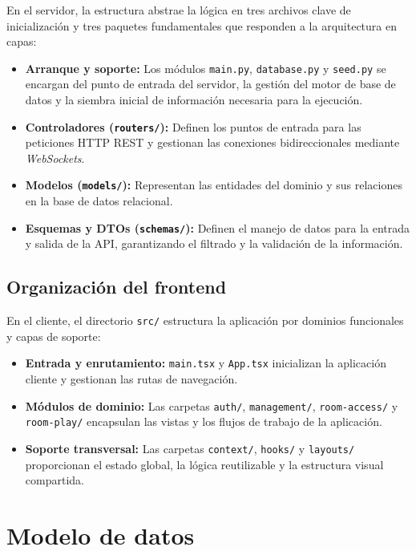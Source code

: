 En el servidor, la estructura abstrae la lógica en tres archivos clave de inicialización y tres paquetes fundamentales que responden a la arquitectura en capas:

\begin{itemize}
    \item \textbf{Arranque y soporte:} Los módulos \texttt{main.py}, \texttt{database.py} y \texttt{seed.py} se encargan del punto de entrada del servidor, la gestión del motor de base de datos y la siembra inicial de información necesaria para la ejecución.
    \item \textbf{Controladores (\texttt{routers/}):} Definen los puntos de entrada para las peticiones HTTP REST y gestionan las conexiones bidireccionales mediante \textit{WebSockets}.
    \item \textbf{Modelos (\texttt{models/}):} Representan las entidades del dominio y sus relaciones en la base de datos relacional.
    \item \textbf{Esquemas y DTOs (\texttt{schemas/}):} Definen el manejo de datos para la entrada y salida de la API, garantizando el filtrado y la validación de la información.
\end{itemize}

\subsection{Organización del frontend}

En el cliente, el directorio \texttt{src/} estructura la aplicación por dominios funcionales y capas de soporte:

\begin{itemize}
    \item \textbf{Entrada y enrutamiento:} \texttt{main.tsx} y \texttt{App.tsx} inicializan la aplicación cliente y gestionan las rutas de navegación.
    \item \textbf{Módulos de dominio:} Las carpetas \texttt{auth/}, \texttt{management/}, \texttt{room-access/} y \texttt{room-play/} encapsulan las vistas y los flujos de trabajo de la aplicación.
    \item \textbf{Soporte transversal:} Las carpetas \texttt{context/}, \texttt{hooks/} y \texttt{layouts/} proporcionan el estado global, la lógica reutilizable y la estructura visual compartida.
\end{itemize}

\section{Modelo de datos}\label{sec:modelado_datos}


